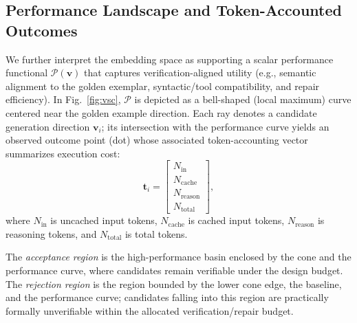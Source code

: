 \documentclass[conference]{IEEEtran}
\begin{document}
\subsection{Performance Landscape and Token-Accounted Outcomes}

We further interpret the embedding space as supporting a scalar performance functional $\mathcal{P}(\mathbf{v})$ that captures verification-aligned utility (e.g., semantic alignment to the golden exemplar, syntactic/tool compatibility, and repair efficiency). In Fig.~\ref{fig:vsc}, $\mathcal{P}$ is depicted as a bell-shaped (local maximum) curve centered near the golden example direction. Each ray denotes a candidate generation direction $\mathbf{v}_i$; its intersection with the performance curve yields an observed outcome point (dot) whose associated token-accounting vector summarizes execution cost:
\[
\mathbf{t}_i =
\begin{bmatrix}
N_{\mathrm{in}} \\
N_{\mathrm{cache}} \\
N_{\mathrm{reason}} \\
N_{\mathrm{total}}
\end{bmatrix},
\]
where $N_{\mathrm{in}}$ is uncached input tokens, $N_{\mathrm{cache}}$ is cached input tokens, $N_{\mathrm{reason}}$ is reasoning tokens, and $N_{\mathrm{total}}$ is total tokens.

The \emph{acceptance region} is the high-performance basin enclosed by the cone and the performance curve, where candidates remain verifiable under the design budget. The \emph{rejection region} is the region bounded by the lower cone edge, the baseline, and the performance curve; candidates falling into this region are practically formally unverifiable within the allocated verification/repair budget.


\end{document}
